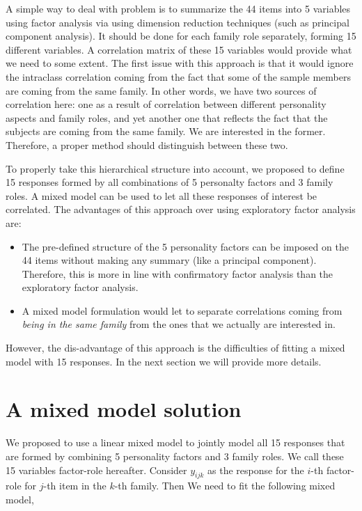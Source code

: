 \documentclass[11pt,a5paper,twoside]{book}
\begin{document}
A simple way to deal with problem is to summarize the 44 items into 5 variables using factor analysis via using dimension reduction techniques (such as principal component analysis). It should be done for each family role separately, forming 15 different variables. A correlation matrix of these 15 variables would provide what we need to some extent. The first issue with this approach is that it would ignore the intraclass correlation coming from the fact that some of the sample members are coming from the same family. In other words, we have two sources of correlation here: one as a result of correlation between different personality aspects and family roles, and yet another one that reflects the fact that the subjects are coming from the same family. We are interested in the former. Therefore, a proper method should distinguish between these two.

To properly take this hierarchical structure into account, we proposed to define 15 responses formed by all combinations of 5 personalty factors and 3 family roles. A mixed model can be used to let all these responses of interest be correlated. The advantages of this approach over using exploratory factor analysis are:

\begin{itemize}
\item The pre-defined structure of the 5 personality factors can be imposed on the 44 items without making any summary (like a principal component). Therefore, this is more in line with confirmatory factor analysis than the exploratory factor analysis.

\item A mixed model formulation would let to separate correlations coming from \emph{being in the same family} from the ones that we actually are interested in.
\end{itemize}

However, the dis-advantage of this approach is the difficulties of fitting a mixed model with 15 responses. In the next section we will provide more details.

\section{A mixed model solution}

We proposed to use a linear mixed model to jointly model all 15 responses that are formed by combining 5 personality factors and 3 family roles. We call these 15 variables factor-role hereafter. Consider $y_{ijk}$ as the response for the $i$-th factor-role for $j$-th item in the $k$-th family. Then We need to fit the following mixed model,
\end{document}
